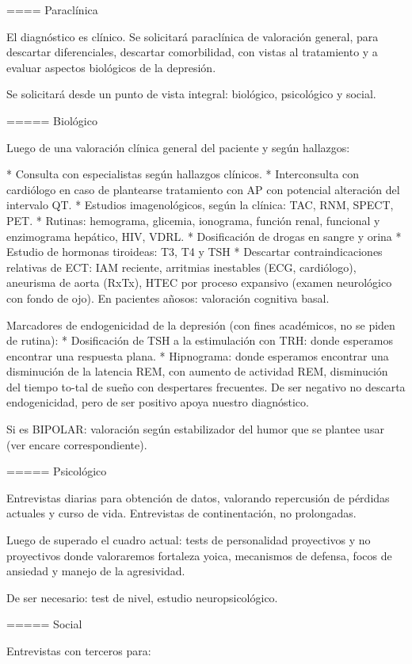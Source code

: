 \documentclass[encares.tex]{subfiles}
\begin{document}
==== Paraclínica

El diagnóstico es clínico. Se solicitará paraclínica de valoración general, para descartar diferenciales, descartar comorbilidad, con vistas al tratamiento y a evaluar aspectos biológicos de la depresión.

Se solicitará desde un punto de vista integral: biológico, psicológico y social.

===== Biológico

Luego de una valoración clínica general del paciente y según hallazgos:

* Consulta con especialistas según hallazgos clínicos.
* Interconsulta con cardiólogo en caso de plantearse tratamiento con AP con potencial alteración del intervalo QT.
* Estudios imagenológicos, según la clínica: TAC, RNM, SPECT, PET.
* Rutinas: hemograma, glicemia, ionograma, función renal, funcional y enzimograma hepático, HIV, VDRL.
* Dosificación de drogas en sangre y orina
* Estudio de hormonas tiroideas: T3, T4 y TSH
* Descartar contraindicaciones relativas de ECT: IAM reciente, arritmias inestables (ECG, cardiólogo), aneurisma de aorta (RxTx), HTEC por proceso expansivo (examen neurológico con fondo de ojo). En pacientes añosos: valoración cognitiva basal.

Marcadores de endogenicidad de la depresión (con fines académicos, no se piden de rutina):
* Dosificación de TSH a la estimulación con TRH: donde esperamos encontrar una respuesta plana.
* Hipnograma: donde esperamos encontrar una disminución de la latencia REM, con aumento de actividad REM, disminución del tiempo to-tal de sueño con despertares frecuentes. De ser negativo no descarta endogenicidad, pero de ser positivo apoya nuestro diagnóstico.

Si es BIPOLAR: valoración según estabilizador del humor que se plantee usar (ver encare correspondiente).

===== Psicológico

Entrevistas diarias para obtención de datos, valorando repercusión de pérdidas actuales y curso de vida. Entrevistas de continentación, no prolongadas.

Luego de superado el cuadro actual: tests de personalidad proyectivos y no proyectivos donde valoraremos fortaleza yoica, mecanismos de defensa, focos de ansiedad y manejo de la agresividad.

De ser necesario: test de nivel, estudio neuropsicológico.

===== Social

Entrevistas con terceros para:
\end{document}
